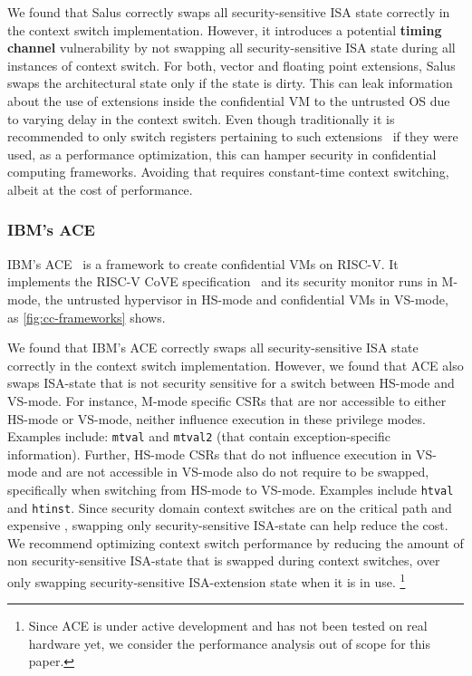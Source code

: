 We found that Salus correctly swaps all security-sensitive ISA state correctly in the context switch implementation. 
However, it introduces a potential \textbf{timing channel} vulnerability by not swapping all security-sensitive ISA state during all instances of context switch. 
For both, vector and floating point extensions, Salus swaps the architectural state only if the state is dirty. 
This can leak information about the use of extensions inside the confidential VM to the untrusted OS due to varying delay in the context switch. 
Even though traditionally it is recommended to only switch registers pertaining to such extensions~\cite{context-switch-cost-hotos} if they were used, as a performance optimization, this can hamper security in confidential computing frameworks. 
Avoiding that requires constant-time context switching, albeit at the cost of performance.

\subsubsection{IBM's ACE}
IBM's ACE~\cite{ibm-ace} is a framework to create confidential VMs on RISC-V. It implements the RISC-V CoVE specification~\cite{riscv2025cove} and its security monitor runs in M-mode, the untrusted hypervisor in HS-mode and confidential VMs in VS-mode, as \autoref{fig:cc-frameworks} shows. 

We found that IBM's ACE correctly swaps all security-sensitive ISA state correctly in the context switch implementation. 
However, we found that ACE also swaps ISA-state that is not security sensitive for a switch between HS-mode and VS-mode. 
For instance, M-mode specific CSRs that are nor accessible to either HS-mode or VS-mode, neither influence execution in these privilege modes. 
Examples include: \texttt{mtval} and \texttt{mtval2} (that contain exception-specific information). 
Further, HS-mode CSRs that do not influence execution in VS-mode and are not accessible in VS-mode also do not require to be swapped, specifically when switching from HS-mode to VS-mode.
Examples include \texttt{htval} and \texttt{htinst}.
Since security domain context switches are on the critical path and expensive \cite{context-switch-cost, context-switch-cost-hotos}, swapping only security-sensitive ISA-state can help reduce the cost. 
We recommend optimizing context switch performance by reducing the amount of non security-sensitive ISA-state that is swapped during context switches, over only swapping security-sensitive ISA-extension state when it is in use. 
\footnote{Since ACE is under active development and has not been tested on real hardware yet, we consider the performance analysis out of scope for this paper.}


